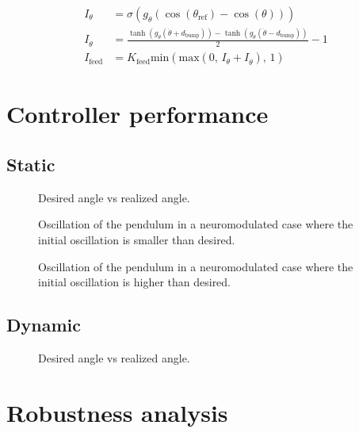 \begin{align}
    I_\theta &= \sigma\left(g_\theta\left(\cos\left(\theta_\text{ref}\right) - \cos\left(\theta\right)\right)\right)\\
    I_{\dot{\theta}} &= \frac{\tanh\left(g_{\dot{\theta}}\left(\dot{\theta}+d_\text{bump}\right)\right) -\tanh\left(g_{\dot{\theta}}\left(\dot{\theta}-d_\text{bump}\right)\right)}{2}-1\\
    I_\text{feed} &= K_\text{feed}\text{min}\left(\text{max}\left(0,\, I_\theta + I_{\dot{\theta}}\right),\, 1\right)
\end{align}


\section{Controller performance}

\subsection{Static}

\begin{figure}
    \centering
    \caption{Desired angle vs realized angle.}
    \label{fig:neuromod_tgt}
\end{figure}

\begin{figure}
    \centering
    \caption{Oscillation of the pendulum in a neuromodulated case where the initial oscillation is smaller than desired.}
    \label{fig:neuromod_up}
\end{figure}

\begin{figure}
    \centering
    \caption{Oscillation of the pendulum in a neuromodulated case where the initial oscillation is higher than desired.}
    \label{fig:neuromod_down}
\end{figure}

\subsection{Dynamic}

\begin{figure}
    \centering
    \caption{Desired angle vs realized angle.}
    \label{fig:neuromod_gain}
\end{figure}



\section{Robustness analysis}
